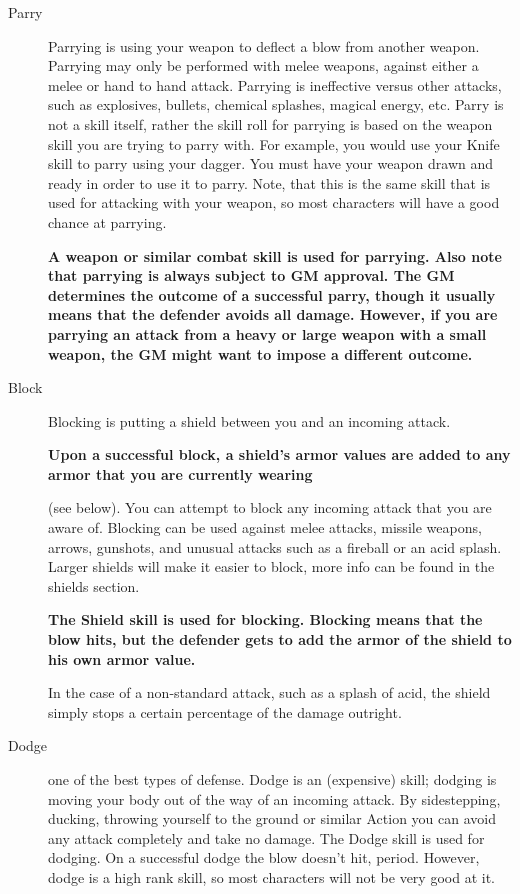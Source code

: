 \documentclass[twoside]{book}
\begin{document}
\begin{description}
    
  \item[Parry] 
    {  
    Parrying is using your weapon to deflect a blow from another weapon. Parrying may only be performed with melee weapons, against either a melee or hand to hand attack. Parrying is ineffective versus other attacks, such as explosives, bullets, chemical splashes, magical energy, etc. Parry is not a skill itself, rather the skill roll for parrying is based on the weapon skill you are trying to parry with. For example, you would use your Knife skill to parry using your dagger. You must have your weapon drawn and ready in order to use it to parry. Note, that this is the same skill that is used for attacking with your weapon, so most characters will have a good chance at parrying.

 \textbf{A weapon or similar combat skill is used for parrying. Also note that parrying is always subject to GM approval. The GM determines the outcome of a successful parry, though it usually means that the defender avoids all damage. However, if you are parrying an attack from a heavy or large weapon with a small weapon, the GM might want to impose a different outcome.}


    }
  
  \item[Block] 
    {  
    Blocking is putting a shield between you and an incoming attack.

 \textbf{Upon a successful block, a shield's armor values are added to any armor that you are currently wearing}

(see below). You can attempt to block any incoming attack that you are aware of. Blocking can be used against melee attacks, missile weapons, arrows, gunshots, and unusual attacks such as a fireball or an acid splash. Larger shields will make it easier to block, more info can be found in the shields section.

 \textbf{The Shield skill is used for blocking. Blocking means that the blow hits, but the defender gets to add the armor of the shield to his own armor value.}

In the case of a non-standard attack, such as a splash of acid, the shield simply stops a certain percentage of the damage outright.
    }
  
  \item[Dodge] 
    {  
    one of the best types of defense. Dodge is an (expensive) skill; dodging is moving your body out of the way of an incoming attack. By sidestepping, ducking, throwing yourself to the ground or similar Action you can avoid any attack completely and take no damage. The Dodge skill is used for dodging. On a successful dodge the blow doesn't hit, period. However, dodge is a high rank skill, so most characters will not be very good at it.
    }
  
\end{description}
  
\end{document}
